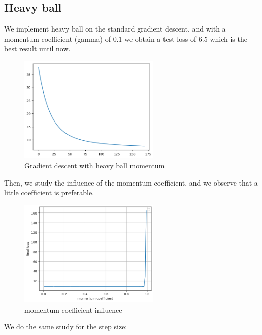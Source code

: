 \documentclass{article}
\begin{document}
    \subsection{Heavy ball}

    We implement heavy ball on the standard gradient descent, and with a momentum coefficient (gamma) of $0.1$ we obtain a test loss of $6.5$ which is the best result until now.

    \begin{figure}[!h]
    \centering
    \includegraphics[width=0.6\textwidth]{images/part7_1.png}
    \caption{Gradient descent with heavy ball momentum}
    \label{fig:sg3}
    \end{figure}  

    Then, we study the influence of the momentum coefficient, and we observe that a little coefficient is preferable.

    \begin{figure}[!h]
    \centering
    \includegraphics[width=0.6\textwidth]{images/part7_2.png}
    \caption{momentum coefficient influence}
    \label{fig:sg3}
    \end{figure}      
    
    \newpage

    We do the same study for the step size:
\end{document}
